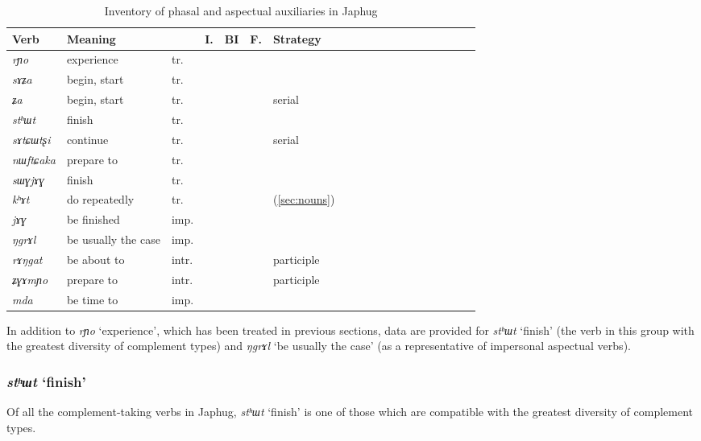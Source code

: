 \documentclass[oneside,a4paper,11pt]{article}
\newcommand{\ipa}[1]{\textit{\phon#1}}
\newcommand{\jpg}[2]{\ipa{#1} `#2'}
\newcommand{\refb}[1]{(\ref{#1})}
\newcommand{\N}{}
\newcommand{\Y}{\Checkmark}
\begin{document}
\begin{table}[H]
\caption{Inventory of phasal and aspectual auxiliaries in Japhug} \label{tab:phasal} 
\begin{tabular}{lllllllllllllllllll}
\toprule
Verb & 	Meaning & 	 & 	I. & 	 	BI & 	F. & 	Strategy & 	\\
\midrule
\ipa{rɲo} & 	experience & 	tr. & 	\Y & 	 	\Y & 	\N & 	\N & 	\\
\ipa{sɤʑa} & 	begin, start & 	tr. & 	\Y & 	 	\Y & 	\N & 	\N & 	\\
\ipa{ʑa} & 	begin, start & 	tr. & 	\Y & 	\Y & 	\N & 	serial & 	\\
\ipa{stʰɯt} & 	finish & 	tr. & 	\Y & 	\Y & 	\N & 	\N & 	\\
\ipa{sɤtɕɯtʂi} & 	continue & 	tr. & 	\Y & 	 	\N & 	\Y & 	serial & 	\\
\ipa{nɯftɕaka} & prepare to & 	tr. & 	\Y & 	\N & 	\Y & 	\N & 	\\
\ipa{sɯɣjɤɣ} & 	finish & 	tr. & 	\Y & 	\N & 	\N & 	\N & 	\\
\ipa{kʰɤt} & 	do repeatedly & 	tr. & 	\Y & 	\N & 	\N & 	\refb{sec:nouns}& 	\\
\midrule
\ipa{jɤɣ} & 	be finished & 	imp. & 	\Y & 	\Y & 	\N & 	\N & 	\\
\ipa{ŋgrɤl} & 	be usually the case & 	imp. & 		\N & 	\N & 	\Y & 	\N & 	\\
\ipa{rɤŋgat} & 	be about to & 	intr. & 	\N &  	\Y & 	\N & 	participle & 	\\
\ipa{ʑɣɤmɲo} & 	prepare to & 	intr. & 	\N &   	\Y & 	\N & 	participle & 	\\
\ipa{mda} & 	be time to & 	imp. & 	\Y &   \N & 	\Y & 	\N & 	\\
\bottomrule
\end{tabular}
\end{table}

In addition to \jpg{rɲo}{experience}, which has been treated in previous sections, data are provided for \jpg{stʰɯt}{finish} (the verb in this group with the greatest diversity of complement types) and \jpg{ŋgrɤl}{be usually the case} (as a representative of impersonal aspectual verbs).

\subsubsection{\jpg{stʰɯt}{finish}}
Of all the complement-taking verbs in Japhug, \jpg{stʰɯt}{finish} is one of those which are compatible with the greatest diversity of complement types.
\end{document}
